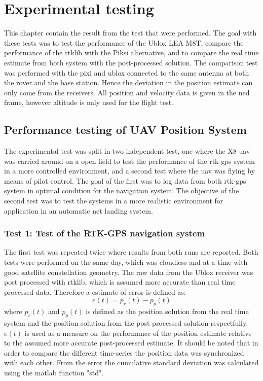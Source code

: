 
\chapter{Experimental testing}
This chapter contain the result from the test that were performed. The goal with these tests was to test the performance of the Ublox LEA M8T, compare the performance of the \acrfull{rtklib} with the Piksi alternative, and to compare the real time estimate from both system with the post-processed solution. The comparison test was performed with the pixi and ublox connected to the same antenna at both the rover and the base station. Hence the deviation in the position estimate can only come from the receivers. All position and velocity data is given in the \gls{ned} frame, however altitude is only used for the flight test.
\section{Performance testing of UAV Position System}
The experimental test was split in two independent test, one where the X8 \gls{uav} was carried around on a open field to test the performance of the \gls{rtk-gps} system in a more controlled environment, and a second test where the \gls{uav} was flying by means of pilot control. The goal of the first was to log data from both \gls{rtk-gps} system in optimal condition for the navigation system. The objective of the second test was to test the systems in a more realistic environment for application in an automatic net landing system. 


\subsection{Test 1: Test of the RTK-GPS navigation system}
The first test was repeated twice where results from both runs are reported. Both tests were performed on the same day, which was cloudless and at a time with good satellite constellation geometry. The raw data from the Ublox receiver was post processed with \gls{rtklib}, which is assumed more accurate than real time processed data. Therefore a estimate of error is defined as:
\begin{equation}
e(t) = p_r(t) - p_p(t)
\end{equation}
where $p_r(t)$ and $p_p(t)$ is defined as the position solution from the real time system and the position solution from the post processed solution respectfully. $e(t)$ is used as a measure on the performance of the position estimate relative to the assumed more accurate post-processed estimate. It should be noted that in order to compare the different time-series the position data was synchronized with each other. From the error the cumulative standard deviation was calculated using the matlab function "std".
